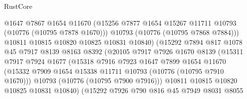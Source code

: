 \begin{lexlean}{RustCore}
\begin{coremodule}
                              @1647
                              @7867
                              @1654
                              @11670
                              (@15256
                                @7877
                                @1654
                                @15267
                                @11711
                                @10793
                                (@10776 (@10795 @7878 @1670)))
                              @10793
                              (@10776 (@10795 @7868 @7884)))
                            @10811
                            @10815
                            @10820
                            @10825
                            @10831
                            @10840)
                          (@15292
                            @7894
                            @817
                            @1078
                            @45
                            @7917
                            @8139
                            @8163
                            @8392
                            (@20105
                              @7917
                              @7926
                              @1670
                              @8139
                              (@15311
                                @7917
                                @7924
                                @1677
                                (@15318
                                  @7916
                                  @7923
                                  @1647
                                  @7899
                                  @1654
                                  @11670
                                  (@15332
                                    @7909
                                    @1654
                                    @15338
                                    @11711
                                    @10793
                                    (@10776 (@10795 @7910 @1670)))
                                  @10793
                                  (@10776 (@10795 @7900 @7916)))
                                @10811
                                @10815
                                @10820
                                @10825
                                @10831
                                @10840)
                              (@15292
                                @7926
                                @790
                                @816
                                @45
                                @7949
                                @8031
                                @8055

\end{coremodule}
\end{lexlean}
